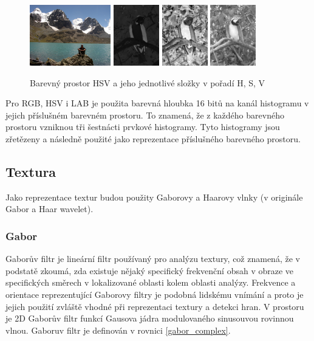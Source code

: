 \documentclass[czech,BP]{thesiskiv}
\begin{document}
\begin{figure}[H]
		\centering
		\includegraphics[height=100px]{./img/img_histogram.jpg}
		\includegraphics[height=100px]{./img/hsv_h.jpg}
		\includegraphics[height=100px]{./img/hsv_s.jpg}
		\includegraphics[height=100px]{./img/hsv_v.jpg}	
		\caption{Barevný prostor HSV a jeho jednotlivé složky v pořadí H, S, V}
\end{figure}

\par Pro RGB, HSV i LAB je použita barevná hloubka 16 bitů na kanál histogramu v jejich příslušném barevném prostoru. To znamená, že z každého barevného prostoru vzniknou tři šestnácti prvkové histogramy. Tyto histogramy jsou zřetězeny a následně použité jako reprezentace příslušného barevného prostoru.

\subsection{Textura}
\par Jako reprezentace textur budou použity Gaborovy a Haarovy vlnky (v originále Gabor a Haar wavelet). 

\subsubsection{Gabor}
\par Gaborův filtr je lineární filtr používaný pro analýzu textury, což znamená, že v podstatě zkoumá, zda existuje nějaký specifický frekvenční obsah v obraze ve specifických směrech v lokalizované oblasti kolem oblasti analýzy. Frekvence a orientace reprezentující Gaborovy filtry je podobná lidskému vnímání a proto je jejich použití zvláště vhodné při reprezentaci textury a detekci hran. V prostoru je 2D Gaborův filtr funkcí Gausova jádra modulovaného sinusouvou rovinnou vlnou. Gaboruv filtr je definován v rovnici \ref{gabor_complex}.
\end{document}

